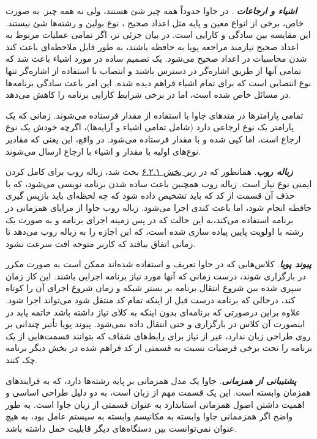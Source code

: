 \documentclass[a4paper,12pt]{report}
\begin{document}
	\textbf{\textit{
	اشیاء و ارجاعات
}}. در جاوا حدوداً همه چیز شئ هستند، ولی نه همه چیز. به صورت خاص، برخی از انواع معین و پایه مثل اعداد صحیح
، نوع بولین
 و رشته‌ها شئ نیستند. این مقایسه بین سادگی و کارایی است. در بیان جزئی تر، اگر تمامی عملیات مربوط به اعداد صحیح نیازمند مراجعه پویا به حافظه باشند، به طور قابل ملاحظه‌ای باعث کند شدن محاسبات در اعداد صحیح می‌شود. یک تصمیم ساده در مورد اشیاء باعث شد که تمامی آنها از طریق اشاره‌گر در دسترس باشند و انتصاب با استفاده از اشاره‌گر تنها نوع انتصابی است که برای تمام اشیاء فراهم دیده شده. این امر باعث سادگی برنامه‌ها در مسائل خاص شده است، اما در برخی شرایط کارایی برنامه را کاهش می‌دهد.

تمامی پارامترها در متدهای جاوا با استفاده از مقدار فرستاده می‌شوند. زمانی که یک پارامتر یک نوع ارجاعی دارد (شامل تمامی اشیاء و آرایه‌ها)، اگرچه خودش یک نوع ارجاع است، اما کپی شده و با مقدار فرستاده می‌شود. در واقع، این یعنی که مقادیر نوع‌های اولیه با مقدار و اشیاء با ارجاع ارسال می‌شوند.
	
	
	\textbf{\textit{
	زباله روب}}. همانطور که در 
	\hyperref[subsec1:sec2:chap6]{
	زیر بخش ۶.۲.۱} بحث شد، زباله روب برای کامل کردن ایمنی نوع  نیاز است. زباله روب همچنین باعث ساده شدن برنامه نویسی می‌شود، که با حذف آن قسمت از کد که باید تشخیص داده شود که چه لحظه‌ای باید بازپس گیری حافظه انجام شود، اما باعث کندی اجرا می‌شود. 
	زباله روب جاوا از مزایای همزمانی در برنامه استفاده می‌کند،‌به این حالت که در پس زمینه اجرای برنامه و به صورت یک رشته با اولویت پایین پیاده سازی شده است، که این اجازه را به زباله روب می‌دهد تا زمانی اتفاق بیافتد که کاربر متوجه افت سرعت نشود.
	
	\textbf{\textit{
	پیوند پویا}}. 
	کلاس‌هایی که در جاوا تعریف و استفاده شده‌اند ممکن است به صورت مکرر در 
	بارگزاری شوند،‌ درست زمانی که آنها مورد نیاز برنامه اجرایی باشند. این کار زمان سپری شده بین شروع انتقال برنامه بر بستر شبکه و زمان شروع اجرای آن را کوتاه کند،‌ درحالی که برنامه درست قبل از اینکه تمام کد منتقل شود می‌تواند اجرا شود. علاوه براین درصورتی که برنامه‌ای بدون اینکه به کلای نیاز داشته باشد خاتمه یابد در اینصورت آن کلاس در 
	 بارگزاری و حتی انتقال داده نمی‌شود. پیوند پویا تأثیر چندانی بر روی طراحی زبان ندارد، غیر از نیاز برای رابط‌های شفاف که بتوانند قسمت‌هایی از یک برنامه را تحت برخی فرضیات نسبت به قسمتی از کد فراهم شده در بخش دیگر برنامه چک کنند.
	
	
	\textbf{\textit{
	پشتیبانی از همزمانی}}. جاوا یک مدل همزمانی بر پایه رشته‌ها
 دارد، که به فرایندهای همزمان وابسته است. این یک قسمت مهم از زبان است، به دو دلیل طراحی اساسی و اهمیت داشتن اصول همزمانی استاندارد به عنوان قسمتی از زبان جاوا است. به طور واضح اگر همزممانی جاوا وابسته به مکانیسم وابسته به سیستم عامل بود، به هیچ عنوان نمی‌توانست بین دستگاه‌های دیگر قابلیت حمل داشته باشد.
 
\end{document}
